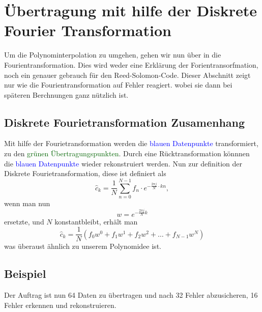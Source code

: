 %
%
%
\section{Übertragung mit hilfe der Diskrete Fourier Transformation
\label{reedsolomon:section:dtf}}
Um die Polynominterpolation zu umgehen, gehen wir nun über in die Fourientransformation.
Dies wird weder eine Erklärung der Forientransorfmation, noch ein genauer gebrauch für den Reed-Solomon-Code. 
Dieser Abschnitt zeigt nur wie die Fourientransformation auf Fehler reagiert.
wobei sie dann bei späteren Berchnungen ganz nützlich ist.

\subsection{Diskrete Fourietransformation Zusamenhang
\label{reedsolomon:subsection:dtfzusamenhang}}
Mit hilfe der Fourietransformation werden die \textcolor{blue}{blauen Datenpunkte} transformiert,
zu den \textcolor{darkgreen}{grünen Übertragungspunkten}. 
Durch eine Rücktransformation könnnen die \textcolor{blue}{blauen Datenpunkte} wieder rekonstruiert werden.
Nun zur definition der Diskrete Fourietransformation, diese ist definiert als
\begin{equation}
	\hat{c}_{k} 
	= \frac{1}{N} \sum_{n=0}^{N-1}
	{f}_n \cdot e^{-\frac{2\pi j}{N} \cdot kn}
	,\label{reedsolomon:DFT}
\end{equation}
wenn man nun 
\begin{equation}
	w =
	e^{-\frac{2\pi j}{N} k}
	\label{reedsolomon:DFT_summand}
\end{equation}
ersetzte, und $N$ konstantbleibt, erhält man
\begin{equation}
	\hat{c}_{k}=
	\frac{1}{N}( {f}_0 w^0 + {f}_1 w^1 + {f}_2 w^2 + \dots + {f}_{N-1} w^N)
	\label{reedsolomon:DFT_polynom}
\end{equation}
was überaust ähnlich zu unserem Polynomidee ist.

\subsection{Beispiel
\label{reedsolomon:subsection:Übertragungsabfolge}}
Der Auftrag ist nun 64 Daten zu übertragen und nach 32 Fehler abzusicheren,
16 Fehler erkennen und rekonstruieren.

